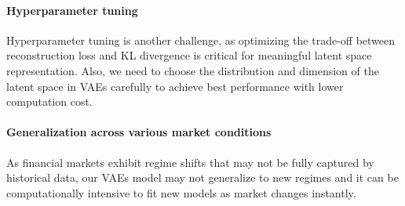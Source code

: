 \documentclass{article}
\begin{document}
\paragraph{Hyperparameter tuning} Hyperparameter tuning is another challenge, as optimizing the trade-off between reconstruction loss and KL divergence is critical for meaningful latent space representation. Also, we need to choose the distribution and dimension of the latent space in VAEs carefully to achieve best performance with lower computation cost.

\paragraph{Generalization across various market conditions}
 As financial markets exhibit regime shifts that may not be fully captured by historical data, our VAEs model may not generalize to new regimes and it can be computationally intensive to fit new models as market changes instantly.



 
\end{document}
